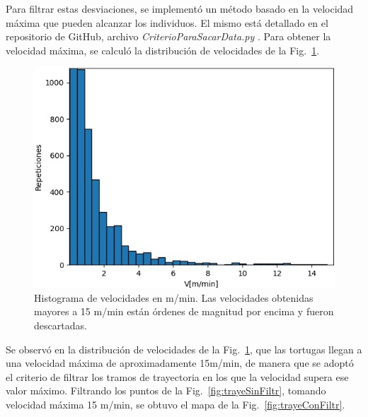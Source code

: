  
 
 
Para filtrar estas desviaciones, se implementó un método basado en la velocidad máxima que pueden alcanzar los individuos. El mismo está detallado en el repositorio de GitHub, archivo \textit{CriterioParaSacarData.py} \cite{github}. Para obtener la velocidad máxima, se calculó la distribución de velocidades de la Fig.~\ref{fig:distribuciondeVel}.
 
 
\begin{figure}[ht]
\begin{center}
       
   
    \includegraphics[width=\imsize]{Chap2/Velocidades2.jpeg}
    \caption[Distribución de velocidades.]{Histograma de velocidades en m/min. Las  velocidades obtenidas mayores a 15 m/min están órdenes de magnitud por encima y fueron descartadas.}
    \label{fig:distribuciondeVel}
\end{center}
\end{figure}
Se observó en la distribución de velocidades de la Fig.~\ref{fig:distribuciondeVel}, que las tortugas llegan a una velocidad máxima de aproximadamente 15m/min, de manera que se adoptó el criterio de filtrar los tramos de trayectoria en los que la velocidad supera ese valor máximo. Filtrando los puntos de la Fig.~\ref{fig:trayeSinFiltr}, tomando velocidad máxima 15 m/min, se obtuvo  el mapa de la Fig.~\ref{fig:trayeConFiltr}.
 
 
 
